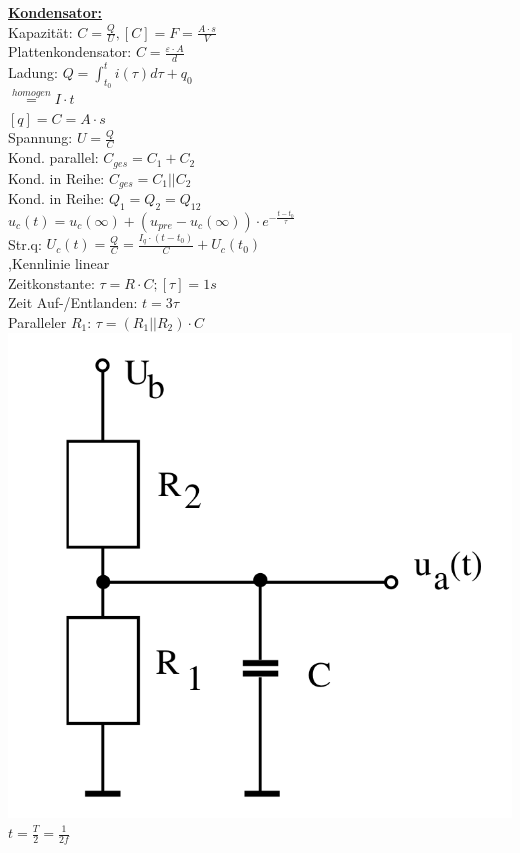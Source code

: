 \documentclass[8pt]{extarticle}
\begin{document}
\begin{minipage}{0.33\textwidth}
\underline{\textbf{Kondensator:}}\\
Kapazität: $C = \frac{Q}{U}, [C]=F=\frac{A \cdot s}{V}$\\
Plattenkondensator: $C=\frac{\varepsilon \cdot A }{d}$\\
Ladung: $Q = \int_{t_0}^t i(\tau) d\tau + q_0$\\
\phantom{sssssssis} $\stackrel{homogen}{=} I \cdot t$\\
\phantom{ssssssssssii} $[q]=C=A \cdot s$\\
Spannung: $U = \frac{Q}{C}$\\
Kond. parallel: $C_{ges} = C_1 + C_2$\\
Kond. in Reihe: $C_{ges} = C_1 || C_2$\\
Kond. in Reihe: $Q_1 = Q_2 = Q_{12}$\\
$u_c(t) = u_c(\infty) + (u_{pre} - u_c(\infty)) \cdot e^{-\frac{t-t_0}{\tau}}$\\
Str.q: $U_c(t) = \frac{Q}{C} = \frac{I_q \cdot (t-t_0)}{C} + U_c(t_0)$\\
\phantom{sss} ,Kennlinie linear\\
Zeitkonstante: $\tau = R \cdot C;[\tau] = 1s$\\
Zeit Auf-/Entlanden: $t = 3\tau$\\
Paralleler $R_1$: $\tau = (R_1 || R_2) \cdot C$\\
\includegraphics[scale=0.1]{kondensatorpr.png}\\
$t =\frac{T}{2} = \frac{1}{2f}$\\


\end{minipage}
\end{document}
